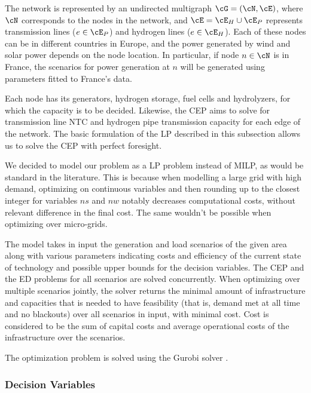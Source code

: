 The network is represented by an undirected multigraph \(\cG = (\cN, \cE)\), where \(\cN\) corresponds to the nodes in the network, and \(\cE = \cE_H \cup \cE_P\) represents transmission lines (\(e \in \cE_P\)) and hydrogen lines (\(e \in \cE_H\)).
Each of these nodes can be in different countries in Europe, and the power generated by wind and solar power depends on the node location. 
In particular, if node \(n \in \cN\) is in France, the scenarios for power generation at \(n\) will be generated using parameters fitted to France's data.

Each node has its generators, hydrogen storage, fuel cells and hydrolyzers, for which the capacity is to be decided. 
Likewise, the CEP aims to solve for transmission line NTC and hydrogen pipe transmission capacity for each edge of the network. 
The basic formulation of the LP described in this subsection allows us to solve the CEP with perfect foresight. 

We decided to model our problem as a LP problem instead of MILP, as would be standard in the literature. 
This is because when modelling a large grid with high demand, optimizing on continuous variables and then rounding up to the closest integer for variables $ns$ and $nw$ notably decreases computational costs, without relevant difference in the final cost. 
The same wouldn't be possible when optimizing over micro-grids.

The model takes in input the generation and load scenarios of the given area along with various parameters indicating costs and efficiency of the current state of technology and possible upper bounds for the decision variables. 
The CEP and the ED problems for all scenarios are solved concurrently. 
When optimizing over multiple scenarios jointly, the solver returns the minimal amount of infrastructure and capacities that is needed to have feasibility (that is, demand met at all time and no blackouts) over all scenarios in input, with minimal cost. 
Cost is considered to be the sum of capital costs and average operational costs of the infrastructure over the scenarios.

The optimization problem is solved using the Gurobi solver \textcolor{green}{\cite{INTRO_gurobi}}.



\subsubsection{Decision Variables}

